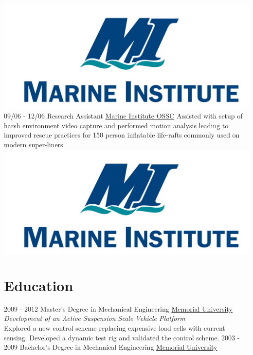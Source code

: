 \documentclass[]{friggeri-cv}
\begin{document}
\begin{entrylist}
	{\includegraphics[scale=0.05]{img/MI.png}}
	\tentry
	{09/06 - 12/06}
	{Research Assistant}
	{\href{https://www.mi.mun.ca//departments/offshoresafetyandsurvivalcentreossc/}{Marine Institute OSSC}}
	{Assisted with setup of harsh environment video capture and performed motion analysis leading to improved rescue practices for 150 person inflatable life-rafts commonly used on modern super-liners.}
	{\includegraphics[scale=0.05]{img/MI.png}}
\end{entrylist}
\section{Education}
\begin{entrylist}
  \entry
    {2009 - 2012}
    {Master's Degree in Mechanical Engineering}
    {\href{https://www.mun.ca}{Memorial University}}
	{\textit{Development of an Active Suspension Scale Vehicle Platform}\\
Explored a new control scheme replacing expensive load cells with current sensing. Developed a dynamic test rig and validated the control scheme.}
  \entry
    {2003 - 2009}
    {Bachelor's Degree in Mechanical Engineering}
    {\href{https://www.mun.ca}{Memorial University}}
    {%
    }
\end{entrylist}
\end{document}
